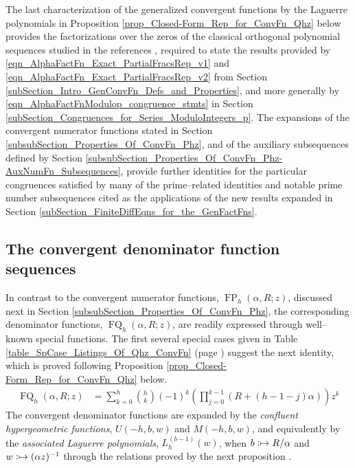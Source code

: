 \documentclass[12pt,reqno]{article}
\numberwithin{sfootnote}{section}
\newcommand{\tableref}[1]{Table \ref{#1} (page \pageref{#1})}
\numberwithin{equation}{section}
\theoremstyle{DefaultTheoremStyle}
\theoremstyle{definition}
\newcommand{\cf}[0]{cf.\ }
\newcommand{\defmapsto}{\ensuremath{\vcentcolon\mapsto}}
\newcommand{\HypU}[3]{\ensuremath{U\left(#1, #2, #3\right)}}
\newcommand{\HypM}[3]{\ensuremath{M\left(#1, #2, #3\right)}}
\DeclareMathOperator{\FP}{FP}
\DeclareMathOperator{\FQ}{FQ}
\begin{document}
The last characterization of the generalized convergent functions by the 
Laguerre polynomials in 
Proposition \ref{prop_Closed-Form_Rep_for_ConvFn_Qhz} 
below provides the factorizations over the 
zeros of the classical orthogonal polynomial sequences studied in the 
references \citep{LGWORKS-ASYMP-SPFNZEROS2008,PROPS-ZEROS-CHYPFNS80}, 
required to state the results provided by 
\eqref{eqn_AlphaFactFn_Exact_PartialFracsRep_v1} and 
\eqref{eqn_AlphaFactFn_Exact_PartialFracsRep_v2} from 
Section \ref{subSection_Intro_GenConvFn_Defs_and_Properties}, and 
more generally by 
\eqref{eqn_AlphaFactFnModulop_congruence_stmts} in 
Section \ref{subSection_Congruences_for_Series_ModuloIntegers_p}. 
The expansions of the convergent numerator functions stated in 
Section \ref{subsubSection_Properties_Of_ConvFn_Phz}, and 
of the auxiliary subsequences defined by 
Section \ref{subsubSection_Properties_Of_ConvFn_Phz-AuxNumFn_Subsequences}, 
provide further identities for the particular congruences satisfied by 
many of the prime--related identities and notable prime number subsequences 
cited as the applications of the new results expanded in 
Section \ref{subSection_FiniteDiffEqns_for_the_GenFactFns}. 


\subsection{The convergent denominator function sequences} 
\label{subsubSection_Properties_Of_ConvFn_Qhz} 

In contrast to the convergent numerator functions, 
$\FP_h(\alpha, R; z)$, discussed next in 
Section \ref{subsubSection_Properties_Of_ConvFn_Phz}, the 
corresponding denominator functions, $\FQ_h(\alpha, R; z)$, 
are readily expressed through well--known special functions. 
The first several special cases given in 
\tableref{table_SpCase_Listings_Of_Qhz_ConvFn} 
suggest the next identity, which is proved following 
Proposition \ref{prop_Closed-Form_Rep_for_ConvFn_Qhz} below. 
\begin{align} 
\label{eqn_PFact_Qhz_product_ident} 
\FQ_h(\alpha, R; z) & = 
     \sum_{k=0}^{h} \binom{h}{k} (-1)^{k} \left(\prod_{j=0}^{k-1} 
     (R + (h-1-j)\alpha)\right) z^k 
\end{align} 
The convergent denominator functions are expanded by the 
\emph{confluent hypergeometric functions}, 
$\HypU{-h}{b}{w}$ and $\HypM{-h}{b}{w}$, 
and equivalently by the 
\emph{associated Laguerre polynomials}, $L_h^{(b-1)}(w)$, 
when $b \defmapsto R / \alpha$ and $w \defmapsto (\alpha z)^{-1}$ 
through the relations proved by the next proposition 
\citep[\cf \S 18.6(iv); \S 13.9(ii)]{NISTHB}. 
\end{document}
